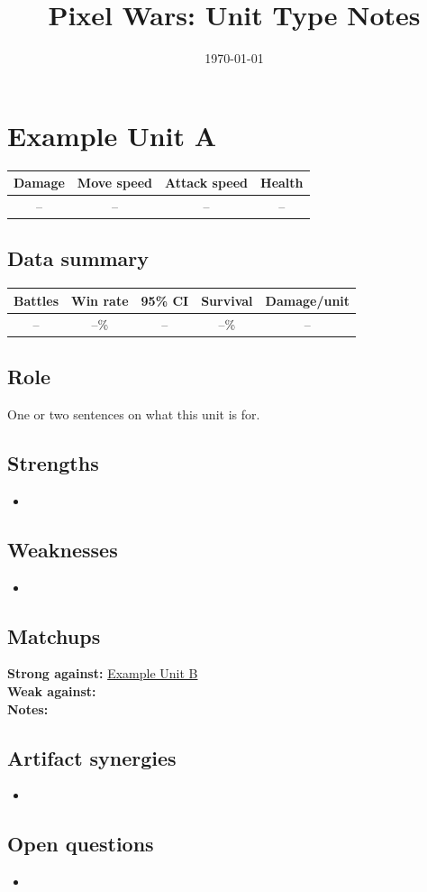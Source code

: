 \documentclass[11pt]{article}
\title{Pixel Wars: Unit Type Notes}
\author{}
\date{\today}
\newcommand{\unit}[5]{%
  \section{#1}\label{unit:#1}
  \begin{center}
    \begin{tabular}{cccc}
      \toprule
      Damage & Move speed & Attack speed & Health \\
      \midrule
      #2 & #3 & #4 & #5 \\
      \bottomrule
    \end{tabular}
  \end{center}
}
\newcommand{\unitdata}[5]{%
  \subsection*{Data summary}
  \begin{center}
    \begin{tabular}{ccccc}
      \toprule
      Battles & Win rate & 95\% CI & Survival & Damage/unit \\
      \midrule
      #1 & #2 & #3 & #4 & #5 \\
      \bottomrule
    \end{tabular}
  \end{center}
}
\newcommand{\unitref}[1]{\hyperref[unit:#1]{#1}}
\begin{document}
\maketitle
\tableofcontents
\newpage


\unit{Example Unit A}{--}{--}{--}{--}
\unitdata{--}{--\%}{--}{--\%}{--}

\subsection*{Role}
One or two sentences on what this unit is for.

\subsection*{Strengths}
\begin{itemize}
  \item
\end{itemize}

\subsection*{Weaknesses}
\begin{itemize}
  \item
\end{itemize}

\subsection*{Matchups}
\textbf{Strong against:} \unitref{Example Unit B}\\
\textbf{Weak against:} \\
\textbf{Notes:}

\subsection*{Artifact synergies}
\begin{itemize}
  \item
\end{itemize}

\subsection*{Open questions}
\begin{itemize}
  \item
\end{itemize}
\end{document}
